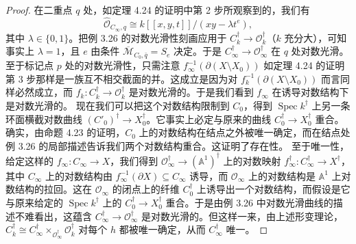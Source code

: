 \begin{proof}
在二重点 $q$ 处，如定理 4.24 的证明中第 2 步所观察到的，我们有
\[
\widehat{\mathcal O}_{C_\infty,q}\cong k[[x,y,t]]/(xy-\lambda t^e),
\]
其中 $\lambda\in\{0,1\}$。把例 3.26 的对数光滑性刻画应用于 $C^\dagger_k\to\mathcal O^\dagger_k$（$k$ 充分大），可知事实上 $\lambda=1$，且 $e$ 由条件 $\overline{\mathcal M}_{C_0,\bar q}=S_e$ 决定。于是 $C^\dagger_\infty\to\mathcal O^\dagger_\infty$ 在 $q$ 处对数光滑。至于标记点 $p$ 处的对数光滑性，只需注意 $f^{-1}_\infty(\partial(X\setminus X_0))$ 如定理 4.24 的证明第 3 步那样是一族互不相交截面的并。这成立是因为对 $f^{-1}_k(\partial(X\setminus X_0))$ 而言同样必然成立，而 $f_k:C^\dagger_k\to\mathcal O^\dagger_k$ 是对数光滑的。于是我们看到 $f_\infty$ 在诱导对数结构下是对数光滑的。
现在我们可以把这个对数结构限制到 $C_0$，得到 $\operatorname{Spec}k^\dagger$ 上另一条环面横截对数曲线 $(C'_0)^\dagger\to X^\dagger_0$。它事实上必定与原来的曲线 $C^\dagger_0\to X^\dagger_0$ 重合。确实，由命题 4.23 的证明，$C_0$ 上的对数结构在结点之外被唯一确定，而在结点处例 3.26 的局部描述告诉我们两个对数结构重合。这证明了存在性。
至于唯一性，给定这样的 $f_\infty:C_\infty\to X$，我们得到 $\mathcal O^\dagger_\infty\to(\mathbb{A}^1)^\dagger$ 上的对数映射 $f^\dagger_\infty:C^\dagger_\infty\to X^\dagger$，其中 $C_\infty$ 上的对数结构由 $f^{-1}_\infty(\partial X)\subseteq C_\infty$ 诱导，而 $\mathcal O_\infty$ 上的对数结构是 $\mathbb{A}^1$ 上对数结构的拉回。这在 $\mathcal O_\infty$ 的闭点上的纤维 $C^\dagger_0$ 上诱导出一个对数结构，而假设是它与原来给定的 $\operatorname{Spec}k^\dagger$ 上的 $C^\dagger_0\to X^\dagger_0$ 重合。于是由例 3.26 中对数光滑曲线的描述不难看出，这蕴含 $C^\dagger_\infty\to\mathcal O^\dagger_\infty$ 是对数光滑的。但这样一来，由上述形变理论，$C^\dagger_k\cong C^\dagger_\infty\times_{\mathcal O^\dagger_\infty}\mathcal O^\dagger_k$ 对每个 $h$ 都被唯一确定，从而 $C^\dagger_\infty$ 唯一。
\end{proof}

